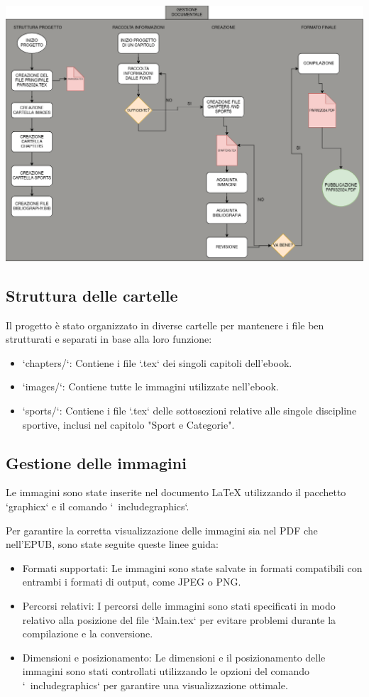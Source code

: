 \documentclass[a4paper,12pt]{report}
\begin{document}
\includegraphics[width=1\textwidth]{GestioneDocumentale.png}

\subsection{Struttura delle cartelle}

Il progetto è stato organizzato in diverse cartelle per mantenere i file ben strutturati e separati in base alla loro funzione:

\begin{itemize}
\item `chapters/`: Contiene i file `.tex` dei singoli capitoli dell'ebook.
\item `images/`: Contiene tutte le immagini utilizzate nell'ebook.
\item `sports/`: Contiene i file `.tex` delle sottosezioni relative alle singole discipline sportive, inclusi nel capitolo "Sport e Categorie".
\end{itemize}

\subsection{Gestione delle immagini}

Le immagini sono state inserite nel documento LaTeX utilizzando il pacchetto `graphicx` e il comando `\ includegraphics`. 

Per garantire la corretta visualizzazione delle immagini sia nel PDF che nell'EPUB, sono state seguite queste linee guida:

\begin{itemize}
\item Formati supportati: Le immagini sono state salvate in formati compatibili con entrambi i formati di output, come JPEG o PNG.
\item Percorsi relativi: I percorsi delle immagini sono stati specificati in modo relativo alla posizione del file `Main.tex` per evitare problemi durante la compilazione e la conversione.
\item Dimensioni e posizionamento: Le dimensioni e il posizionamento delle immagini sono stati controllati utilizzando le opzioni del comando `\ includegraphics` per garantire una visualizzazione ottimale.
\end{itemize}
\end{document}

